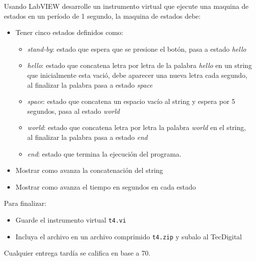 \documentclass[12pt]{article}
\begin{document}
\setlength{\parindent}{0em}

Usando LabVIEW desarrolle un instrumento virtual que ejecute una maquina de estados en un período de 1 segundo, la maquina de estados debe:

\begin{itemize}
    \item Tener cinco estados definidos como:
        \begin{itemize}
            \item \emph{stand-by}: estado que espera que se presione el botón, pasa a estado \emph{hello}
            \item \emph{hello}: estado que concatena letra por letra de la palabra \emph{hello} en un string que inicialmente esta vació, debe aparecer una nueva letra cada segundo, al finalizar la palabra pasa a estado \emph{space}
            \item \emph{space}: estado que concatena un espacio vacío al string y espera por 5 segundos, pasa al estado \emph{world}
            \item \emph{world}: estado que concatena letra por letra la palabra \emph{world} en el string, al finalizar la palabra pasa a estado \emph{end}
            \item \emph{end}: estado que termina la ejecución del programa.
        \end{itemize}
    \item Mostrar como avanza la concatenación del string
    \item Mostrar como avanza el tiempo en segundos en cada estado
\end{itemize}

Para finalizar: 
\begin{itemize}
    \item Guarde el instrumento virtual \verb+t4.vi+
    \item Incluya el archivo en un archivo comprimido \verb+t4.zip+ y subalo al TecDigital
\end{itemize}

Cualquier entrega tardía se califica en base a 70. 


% 
% 
\end{document}
